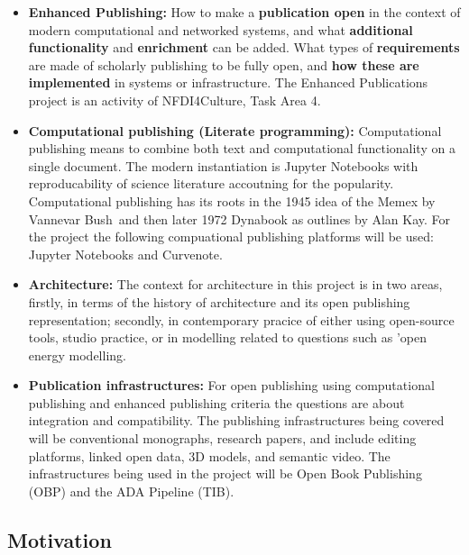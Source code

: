 \documentclass{article}
\begin{document}
\begin{itemize}
\item \textbf{Enhanced Publishing:} How to make a \textbf{publication open} in the context of modern computational and networked systems, and what \textbf{additional functionality} and \textbf{enrichment} can be added. What types of \textbf{requirements }are made of scholarly publishing to be fully open, and \textbf{how these are implemented }in systems or infrastructure. The Enhanced Publications project is an activity of NFDI4Culture, Task Area 4. \autocite{WorthingtonSimon20220303}


\item \textbf{Computational publishing (Literate programming):} Computational publishing means to combine both text and computational functionality on a single document. The modern instantiation is Jupyter Notebooks with reproducability of science literature accoutning for the popularity. Computational publishing has its roots in the 1945 idea of the Memex by Vannevar Bush and then later 1972 Dynabook as outlines by Alan Kay.\autocite{OdewahnAndrew20210619T14:43:08Z} For the project the following compuational publishing platforms will be used: Jupyter Notebooks and Curvenote.


\item \textbf{Architecture:} The context for architecture in this project is in two areas, firstly, in terms of the history of architecture and its open publishing representation; secondly, in contemporary pracice of either using open-source tools, studio practice, or in modelling related to questions such as 'open energy modelling.


\item \textbf{Publication infrastructures:} For open publishing using computational publishing and enhanced publishing criteria the questions are about integration and compatibility. The publishing infrastructures being covered will be conventional monographs, research papers, and include editing platforms, linked open data, 3D models, and semantic video. The infrastructures being used in the project will be Open Book Publishing (OBP) and the ADA Pipeline (TIB).


\end{itemize}

\subsection{Motivation}\label{H2831995}
\end{document}

